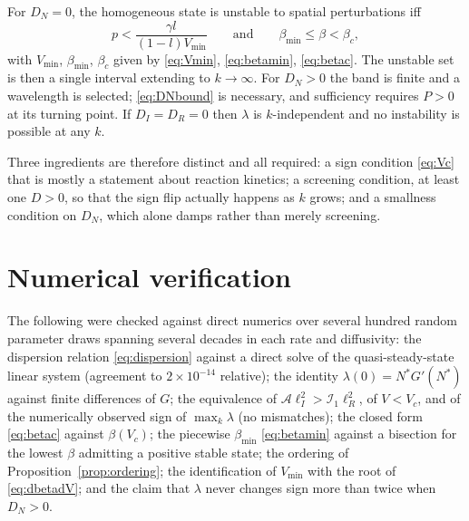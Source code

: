 \documentclass[11pt,a4paper]{article}
\newcommand{\Ns}{N^{*}}
\newcommand{\Ai}{\mathcal{A}}
\newcommand{\Ione}{\mathcal{I}_1}
\newcommand{\lI}{\ell_I}
\newcommand{\lR}{\ell_R}
\theoremstyle{plain}
\theoremstyle{remark}
\begin{document}
For $D_N=0$, the homogeneous state is unstable to spatial perturbations iff
\begin{equation}
p < \frac{\gamma l}{(1-l)V_{\min}}
\qquad\text{and}\qquad
\beta_{\min} \le \beta < \beta_c ,
\end{equation}
with $V_{\min}$, $\beta_{\min}$, $\beta_c$ given by \eqref{eq:Vmin},
\eqref{eq:betamin}, \eqref{eq:betac}. The unstable set is then a single interval
extending to $k\to\infty$. For $D_N>0$ the band is finite and a wavelength is
selected; \eqref{eq:DNbound} is necessary, and sufficiency requires $P>0$ at its
turning point. If $D_I=D_R=0$ then $\lambda$ is $k$-independent and no
instability is possible at any $k$.

Three ingredients are therefore distinct and all required: a sign condition
\eqref{eq:Vc} that is mostly a statement about reaction kinetics; a screening
condition, at least one $D>0$, so that the sign flip actually happens as $k$
grows; and a smallness condition on $D_N$, which alone damps rather than merely
screening.

\appendix
\section{Numerical verification}

The following were checked against direct numerics over several hundred random
parameter draws spanning several decades in each rate and diffusivity:
the dispersion relation \eqref{eq:dispersion} against a direct solve of the
quasi-steady-state linear system (agreement to $2\times10^{-14}$ relative);
the identity $\lambda(0)=\Ns G'(\Ns)$ against finite differences of $G$;
the equivalence of $\Ai\lI^2>\Ione\lR^2$, of $V<V_c$, and of the numerically
observed sign of $\max_k\lambda$ (no mismatches);
the closed form \eqref{eq:betac} against $\beta(V_c)$;
the piecewise $\beta_{\min}$ \eqref{eq:betamin} against a bisection for the
lowest $\beta$ admitting a positive stable state;
the ordering of Proposition~\ref{prop:ordering};
the identification of $V_{\min}$ with the root of \eqref{eq:dbetadV}; and the
claim that $\lambda$ never changes sign more than twice when $D_N>0$.
\end{document}
